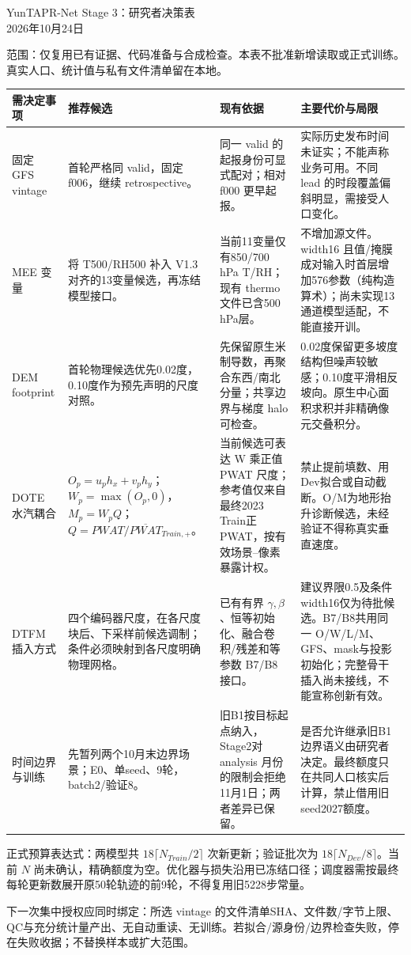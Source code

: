 \documentclass[UTF8,10pt]{ctexart}
\begin{document}
\begin{center}{\Large YunTAPR-Net Stage 3：研究者决策表}\\[4pt]2026年10月24日\end{center}
范围：仅复用已有证据、代码准备与合成检查。本表不批准新增读取或正式训练。真实人口、统计值与私有文件清单留在本地。\par\smallskip
\small
\begin{tabularx}{\textwidth}{p{2.1cm}XXX}
\toprule 需决定事项 & 推荐候选 & 现有依据 & 主要代价与局限\\\midrule
固定 GFS vintage & 首轮严格同 valid，固定 f006，继续 retrospective。 & 同一 valid 的起报身份可显式配对；相对 f000 更早起报。 & 实际历史发布时间未证实；不能声称业务可用。不同 lead 的时段覆盖偏斜明显，需接受人口变化。\\
MEE 变量 & 将 T500/RH500 补入 V1.3 对齐的13变量候选，再冻结模型接口。 & 当前11变量仅有850/700 hPa T/RH；现有 thermo 文件已含500 hPa层。 & 不增加源文件。width16 且值/掩膜成对输入时首层增加576参数（纯构造算术）；尚未实现13通道模型适配，不能直接开训。\\
DEM footprint & 首轮物理候选优先0.02度，0.10度作为预先声明的尺度对照。 & 先保留原生米制导数，再聚合东西/南北分量；共享边界与梯度 halo 可检查。 & 0.02度保留更多坡度结构但噪声较敏感；0.10度平滑相反坡向。原生中心面积求积并非精确像元交叠积分。\\
DOTE 水汽耦合 & $O_p=u_p h_x+v_p h_y$；$W_p=\max(O_p,0)$，$M_p=W_pQ$；$Q=PWAT/\overline{PWAT}_{Train,+}$。 & 当前候选可表达 W 乘正值 PWAT 尺度；参考值仅来自最终2023 Train正PWAT，按有效场景--像素暴露计权。 & 禁止提前填数、用Dev拟合或自动截断。O/M为地形抬升诊断候选，未经验证不得称真实垂直速度。\\
DTFM 插入方式 & 四个编码器尺度，在各尺度块后、下采样前候选调制；条件必须映射到各尺度明确物理网格。 & 已有有界 $\gamma,\beta$、恒等初始化、融合卷积/残差和等参数 B7/B8 接口。 & 建议界限0.5及条件width16仅为待批候选。B7/B8共用同一 O/W/L/M、GFS、mask与投影初始化；完整骨干插入尚未接线，不能宣称创新有效。\\
时间边界与训练 & 先暂列两个10月末边界场景；E0、单seed、9轮，batch2/验证8。 & 旧B1按目标起点纳入，Stage2对 analysis 月份的限制会拒绝11月1日；两者差异已保留。 & 是否允许继承旧B1边界语义由研究者决定。最终额度只在共同人口核实后计算，禁止借用旧seed2027额度。\\\bottomrule
\end{tabularx}
\normalsize\medskip
正式预算表达式：两模型共 $18\lceil N_{Train}/2\rceil$ 次新更新；验证批次为 $18\lceil N_{Dev}/8\rceil$。当前 $N$ 尚未确认，精确额度为空。优化器与损失沿用已冻结口径；调度器需按最终每轮更新数展开原50轮轨迹的前9轮，不得复用旧5228步常量。\par\smallskip
下一次集中授权应同时绑定：所选 vintage 的文件清单SHA、文件数/字节上限、QC与充分统计量产出、无自动重读、无训练。若拟合/源身份/边界检查失败，停在失败收据；不替换样本或扩大范围。
\end{document}
